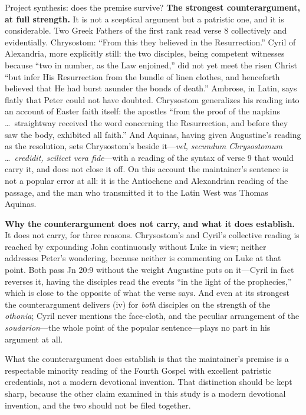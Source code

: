 \begin{studybox}{Project synthesis: does the premise survive?}
\textbf{The strongest counterargument, at full strength.} It is not a
sceptical argument but a patristic one, and it is considerable. Two Greek
Fathers of the first rank read verse 8 collectively and evidentially.
Chrysostom: ``From this they believed in the Resurrection.'' Cyril of
Alexandria, more explicitly still: the two disciples, being competent witnesses
because ``two in number, as the Law enjoined,'' did not yet meet the risen
Christ ``but infer His Resurrection from the bundle of linen clothes, and
henceforth believed that He had burst asunder the bonds of death.'' Ambrose, in
Latin, says flatly that Peter could not have doubted. Chrysostom generalizes his
reading into an account of Easter faith itself: the apostles ``from the proof of
the napkins \ldots\ straightway received the word concerning the Resurrection,
and before they saw the body, exhibited all faith.'' And Aquinas, having given
Augustine's reading as the resolution, sets Chrysostom's beside it---\emph{vel,
secundum Chrysostomum} \ldots\ \emph{credidit, scilicet vera fide}---with a
reading of the syntax of verse 9 that would carry it, and does not close it off.
On this account the maintainer's sentence is not a popular error at all: it is
the Antiochene and Alexandrian reading of the passage, and the man who
transmitted it to the Latin West was Thomas Aquinas.

\textbf{Why the counterargument does not carry, and what it does establish.} It
does not carry, for three reasons. Chrysostom's and Cyril's collective reading
is reached by expounding John continuously without Luke in view; neither
addresses Peter's wondering, because neither is commenting on Luke at that
point. Both pass Jn 20:9 without the weight Augustine puts on it---Cyril in
fact reverses it, having the disciples read the events ``in the light of the
prophecies,'' which is close to the opposite of what the verse says. And even
at its strongest the counterargument delivers (iv) for \emph{both} disciples on
the strength of the \emph{othonia}; Cyril never mentions the face-cloth, and the
peculiar arrangement of the \emph{soudarion}---the whole point of the popular
sentence---plays no part in his argument at all.

What the counterargument does establish is that the maintainer's premise is a
respectable minority reading of the Fourth Gospel with excellent patristic
credentials, not a modern devotional invention. That distinction should be kept
sharp, because the other claim examined in this study is a modern devotional
invention, and the two should not be filed together.


\end{studybox}
